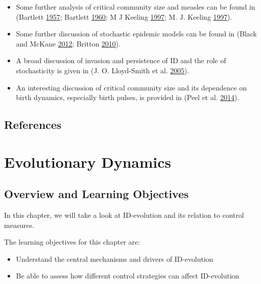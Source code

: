 \documentclass[]{book}
\providecommand{\tightlist}{%
  \setlength{\itemsep}{0pt}\setlength{\parskip}{0pt}}
\theoremstyle{definition}
\theoremstyle{definition}
\theoremstyle{definition}
\theoremstyle{remark}
\begin{document}
\begin{itemize}
\tightlist
\item
  Some further analysis of critical community size and measles can be
  found in (Bartlett \protect\hyperlink{ref-bartlett57}{1957}; Bartlett
  \protect\hyperlink{ref-bartlett60}{1960}; M J Keeling
  \protect\hyperlink{ref-keeling97}{1997}; M. J. Keeling
  \protect\hyperlink{ref-keeling97a}{1997}).
\item
  Some further discussion of stochastic epidemic models can be found in
  (Black and McKane \protect\hyperlink{ref-black12}{2012}; Britton
  \protect\hyperlink{ref-britton10a}{2010}).
\item
  A broad discussion of invasion and persistence of ID and the role of
  stochasticity is given in (J. O. Lloyd-Smith et al.
  \protect\hyperlink{ref-lloyd-smith05b}{2005}).
\item
  An interesting discussion of critical community size and its
  dependence on birth dynamics, especially birth pulses, is provided in
  (Peel et al. \protect\hyperlink{ref-peel14}{2014}).
\end{itemize}

\section{References}\label{references-13}

\chapter{Evolutionary Dynamics}\label{evolutionary-dynamics}

\section{Overview and Learning
Objectives}\label{overview-and-learning-objectives-13}

In this chapter, we will take a look at ID-evolution and its relation to
control measures.

The learning objectives for this chapter are:

\begin{itemize}
\tightlist
\item
  Understand the central mechanisms and drivers of ID-evolution
\item
  Be able to assess how different control strategies can affect
  ID-evolution
\end{itemize}
\end{document}
